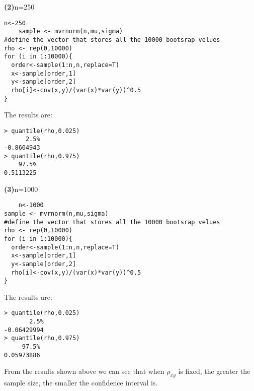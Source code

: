 \documentclass[letterpaper,11pt]{article}
\begin{document}
\begin{addmargin}[0em]{0em} \textbf{(2)}n=250\par \end{addmargin}
\begin{lstlisting}
n<-250
	sample <- mvrnorm(n,mu,sigma)
#define the vector that stores all the 10000 bootsrap velues
rho <- rep(0,10000)
for (i in 1:10000){
  order<-sample(1:n,n,replace=T)
  x<-sample[order,1]
  y<-sample[order,2]
  rho[i]<-cov(x,y)/(var(x)*var(y))^0.5
}
\end{lstlisting}
The results are:
\begin{lstlisting}
> quantile(rho,0.025)
      2.5% 
-0.8604943 
> quantile(rho,0.975)
    97.5% 
0.5113225 
\end{lstlisting}

\begin{addmargin}[0em]{0em} \textbf{(3)}n=1000\par \end{addmargin}
\begin{lstlisting}
	n<-1000
sample <- mvrnorm(n,mu,sigma)
#define the vector that stores all the 10000 bootsrap velues
rho <- rep(0,10000)
for (i in 1:10000){
  order<-sample(1:n,n,replace=T)
  x<-sample[order,1]
  y<-sample[order,2]
  rho[i]<-cov(x,y)/(var(x)*var(y))^0.5
}
\end{lstlisting}
The results are:
\begin{lstlisting}
> quantile(rho,0.025)
       2.5% 
-0.06429994 
> quantile(rho,0.975)
     97.5% 
0.05973886 
\end{lstlisting}


From the results shown above we can see that when $\rho_{xy}$ is fixed, the greater the sample size, the smaller the confidence interval is.
\end{document}
